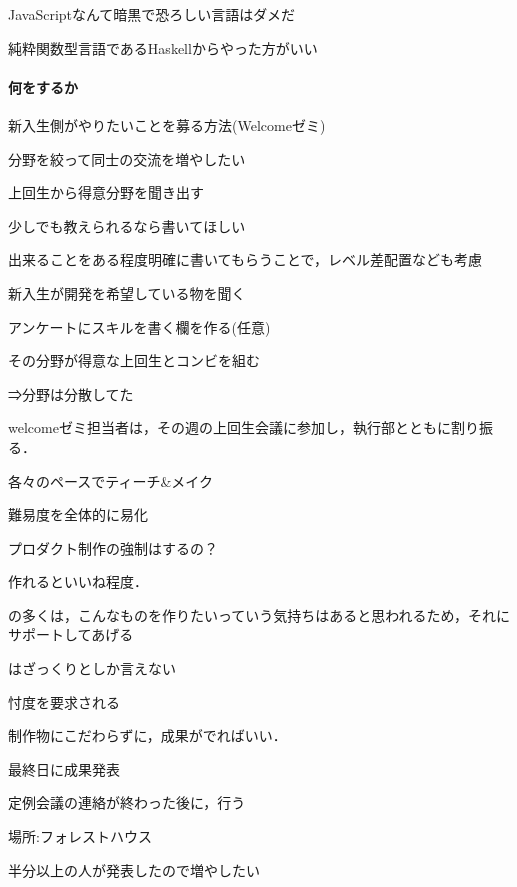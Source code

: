             JavaScriptなんて暗黒で恐ろしい言語はダメだ
            
            純粋関数型言語であるHaskellからやった方がいい
            

\paragraph*{何をするか}
        新入生側がやりたいことを募る方法(Welcomeゼミ)
        
            分野を絞って\firstGrade{}同士の交流を増やしたい
            
            上回生から得意分野を聞き出す
            
        少しでも教えられるなら書いてほしい
        
            出来ることをある程度明確に書いてもらうことで，レベル差配置なども考慮
            
        新入生が開発を希望している物を聞く
        
            アンケートにスキルを書く欄を作る(任意)
            
        その分野が得意な上回生とコンビを組む
        
            ⇒分野は分散してた
            
            welcomeゼミ担当者は，その週の上回生会議に参加し，執行部とともに割り振る．
            

        各々のペースでティーチ\&メイク
        
            難易度を全体的に易化
            
            プロダクト制作の強制はするの？
            
            作れるといいね程度．
            
                \firstGrade{}の多くは，こんなものを作りたいっていう気持ちはあると思われるため，それにサポートしてあげる
                
                \firstGrade{}はざっくりとしか言えない
                
                忖度を要求される
                
                制作物にこだわらずに，成果がでればいい．
                

        最終日に成果発表
        
            定例会議の連絡が終わった後に，行う
            
            場所:フォレストハウス
            
                半分以上の人が発表したので増やしたい
                
